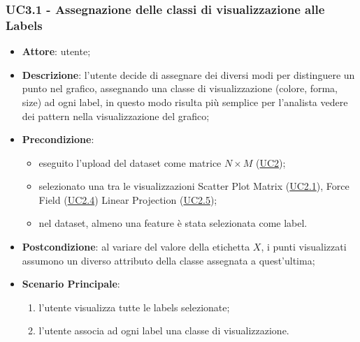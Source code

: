     \subsubsection{UC3.1 - Assegnazione delle classi di visualizzazione alle Labels}
    \label{uc3.1}
    \begin{itemize}
    \item \textbf{Attore}: utente;
    \item \textbf{Descrizione}: l'utente decide di assegnare dei diversi modi per distinguere un punto nel grafico, assegnando una classe di visualizzazione (colore, forma, size) ad ogni label, in questo modo risulta più semplice per l'analista vedere dei pattern nella visualizzazione del grafico;
    \item \textbf{Precondizione}:
    \begin{itemize}
        \item eseguito l'upload del dataset come matrice $N\times M$ (\hyperref[uc2]{UC2});
        \item selezionato una tra le visualizzazioni Scatter Plot Matrix (\hyperref[uc2.1]{UC2.1}), Force Field (\hyperref[uc2.4]{UC2.4}) Linear Projection (\hyperref[uc2.5]{UC2.5});
        \item nel dataset, almeno una feature è stata selezionata come label.
    \end{itemize}
    \item \textbf{Postcondizione}: al variare del valore della etichetta $X$, i punti visualizzati assumono un diverso attributo della classe assegnata a quest'ultima;
    \item \textbf{Scenario Principale}: 
    \begin{enumerate}
        \item l'utente visualizza tutte le labels selezionate;
        \item l'utente associa ad ogni label una classe di visualizzazione.
    \end{enumerate}  
    \end{itemize}